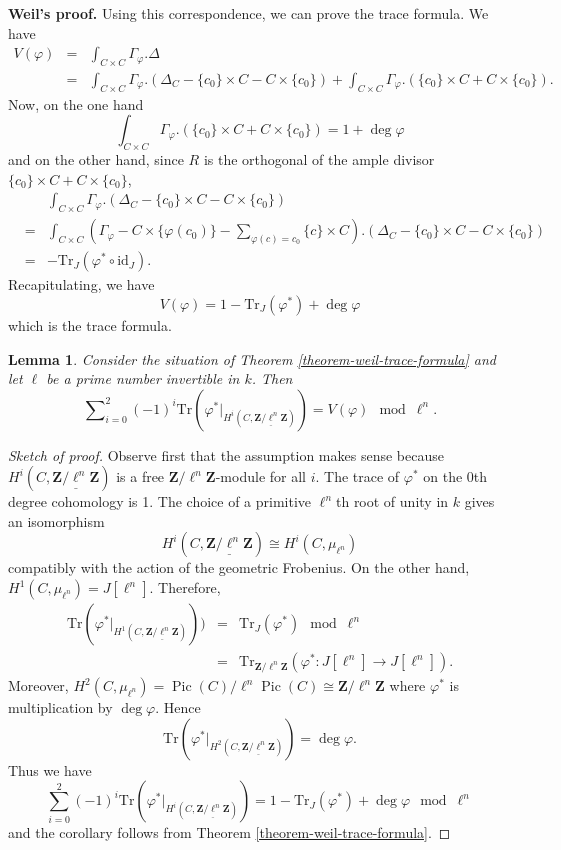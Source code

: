 \documentclass{stacks-project}
\theoremstyle{plain}
\newtheorem{lemma}[subsection]{Lemma}
\theoremstyle{definition}
\theoremstyle{remark}
\numberwithin{equation}{subsection}
\def\Pic{\mathop{\mathrm{Pic}}\nolimits}
\begin{document}
\medskip\noindent
{\bf Weil's proof.} Using this correspondence, we can prove the trace
formula. We have
\begin{eqnarray*}
V(\varphi) & = & \int_{C \times C} \Gamma_\varphi.\Delta \\
& = & \int_{C \times C} \Gamma_\varphi. \left(\Delta_C - \{c_0\} \times C - C
\times \{c_0\}\right) + \int_{C \times C} \Gamma_\varphi. \left(\{c_0\} \times C
+ C \times \{c_0\}\right).
\end{eqnarray*}
Now, on the one hand
$$
\int_{C \times C} \Gamma_\varphi. \left(\{c_0\} \times C + C \times
\{c_0\}\right)
=
1 + \deg \varphi
$$
and on the other hand, since $R$ is the orthogonal of the ample divisor
$\{c_0\} \times C + C \times \{c_0\}$,
\begin{eqnarray*}
& &
\int_{C \times C} \Gamma_\varphi. \left(\Delta_C - \{c_0\} \times C - C \times
\{c_0\}\right) \\
& = &
\int_{C \times C} \left(\Gamma_\varphi - C \times \{\varphi(c_0)\} -
\sum_{\varphi(c) = c_0} \{c\} \times C \right). \left(\Delta_C - \{c_0\} \times
C - C \times \{c_0\}\right) \\
& = & - \text{Tr}_J (\varphi^* \circ \text{id}_J).
\end{eqnarray*}
Recapitulating, we have
$$
V(\varphi) = 1 - \text{Tr}_J (\varphi^*) + \deg \varphi
$$
which is the trace formula.

\begin{lemma}
\label{lemma-weil-mod}
Consider the situation of
Theorem \ref{theorem-weil-trace-formula}
and let $\ell$ be a prime number invertible in $k$. Then
$$
\sum\nolimits_{i = 0}^2
(-1)^i
\text{Tr}(\varphi^* |_{H^i (C, \underline{\mathbf{Z}/\ell^n \mathbf{Z}})})
=
V(\varphi) \mod \ell^n.
$$
\end{lemma}

\begin{proof}[Sketch of proof]
Observe first that the assumption makes sense because $H^i(C,
\underline{\mathbf{Z}/\ell^n \mathbf{Z}})$ is a free $\mathbf{Z}/\ell^n
\mathbf{Z}$-module for all $i$. The trace of $\varphi^*$ on the 0th degree
cohomology is 1. The choice of a primitive $\ell^n$th root of unity in $k$
gives an isomorphism
$$
H^i(C, \underline{\mathbf{Z}/\ell^n \mathbf{Z}}) \cong H^i(C, \mu_{\ell^n})
$$
compatibly with the action of the geometric Frobenius. On the other hand,
$H^1(C, \mu_{\ell^n}) = J[\ell^n]$. Therefore,
\begin{eqnarray*}
\text{Tr}(\varphi^* |_{H^1 (C, \underline{\mathbf{Z}/\ell^n \mathbf{Z}})})) & =
& \text{Tr}_J (\varphi^*) \mod \ell^n \\
& = & \text{Tr}_{\mathbf{Z}/\ell^n \mathbf{Z}} (\varphi^* : J[\ell^n] \to
J[\ell^n]).
\end{eqnarray*}
Moreover, $H^2(C, \mu_{\ell^n}) = \Pic(C)/\ell^n\Pic(C) \cong
\mathbf{Z}/\ell^n \mathbf{Z}$ where $\varphi^*$ is multiplication by $\deg
\varphi$. Hence
$$
\text{Tr} (\varphi^*|_{H^2 (C, \underline{\mathbf{Z}/\ell^n \mathbf{Z}})}) =
\deg \varphi.
$$
Thus we have
$$
\sum_{i = 0}^2 (-1)^i
\text{Tr}(\varphi^* |_{H^i (C, \underline{\mathbf{Z}/\ell^n \mathbf{Z}})}) =
1 - \text{Tr}_J(\varphi^*) + \deg \varphi \mod \ell^n
$$
and the corollary follows from Theorem \ref{theorem-weil-trace-formula}.
\end{proof}
\end{document}
